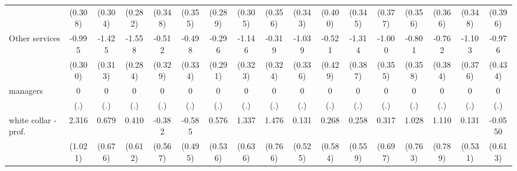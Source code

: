 {\begin{tabular}{l*{16}{c}}
                    &     (0.308)         &     (0.304)         &     (0.282)         &     (0.348)         &     (0.355)         &     (0.289)         &     (0.305)         &     (0.356)         &     (0.343)         &     (0.400)         &     (0.345)         &     (0.377)         &     (0.356)         &     (0.366)         &     (0.348)         &     (0.396)         \\
[1em]
Other services      &      -0.995\sym{***}&      -1.425\sym{***}&      -1.558\sym{***}&      -0.512         &      -0.498         &      -0.296         &      -1.146\sym{***}&      -0.319         &      -1.039\sym{**} &      -0.521         &      -1.314\sym{***}&      -1.000\sym{**} &      -0.801\sym{*}  &      -0.762\sym{*}  &      -1.103\sym{**} &      -0.976\sym{*}  \\
                    &     (0.300)         &     (0.313)         &     (0.284)         &     (0.329)         &     (0.334)         &     (0.291)         &     (0.323)         &     (0.324)         &     (0.336)         &     (0.429)         &     (0.387)         &     (0.355)         &     (0.358)         &     (0.384)         &     (0.376)         &     (0.434)         \\
[1em]
managers            &           0         &           0         &           0         &           0         &           0         &           0         &           0         &           0         &           0         &           0         &           0         &           0         &           0         &           0         &           0         &           0         \\
                    &         (.)         &         (.)         &         (.)         &         (.)         &         (.)         &         (.)         &         (.)         &         (.)         &         (.)         &         (.)         &         (.)         &         (.)         &         (.)         &         (.)         &         (.)         &         (.)         \\
[1em]
white collar - prof.&       2.316\sym{*}  &       0.679         &       0.410         &      -0.382         &      -0.585         &       0.576         &       1.337\sym{*}  &       1.476         &       0.131         &       0.268         &       0.258         &       0.317         &       1.028         &       1.110         &       0.131         &     -0.0550         \\
                    &     (1.021)         &     (0.676)         &     (0.612)         &     (0.567)         &     (0.495)         &     (0.536)         &     (0.636)         &     (0.766)         &     (0.525)         &     (0.584)         &     (0.559)         &     (0.697)         &     (0.763)         &     (0.789)         &     (0.531)         &     (0.613)         \\

\end{tabular}}
